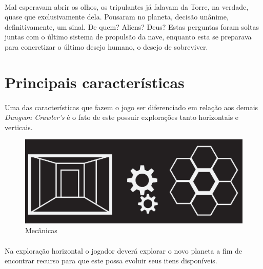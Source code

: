 \documentclass[11pt]{article} %
\begin{document}
\paragraph{}Mal esperavam abrir os olhos, os tripulantes já falavam da Torre, na verdade, quase que exclusivamente dela. Pousaram no planeta, decisão unânime, definitivamente, um sinal. De quem? Aliens? Deus? Estas perguntas foram soltas juntas com o último sistema de propulsão da nave, enquanto esta se preparava para concretizar o último desejo humano, o desejo de sobreviver.

\section*{Principais características}

\paragraph{}Uma das características que fazem o jogo ser diferenciado em relação aos demais \textit{Dungeon Crawler's} é o fato de este possuir explorações tanto horizontais e verticais. 

\newpage

\begin{figure}[!htp]
\centering
\includegraphics[scale=0.3]{res/mechanics.png}
\caption{Mecânicas}
\label{Mecânicas}
\end{figure}

\paragraph{}Na exploração horizontal o jogador deverá explorar o novo planeta a fim de encontrar recurso para que este possa evoluir seus itens disponíveis. 
\end{document}
